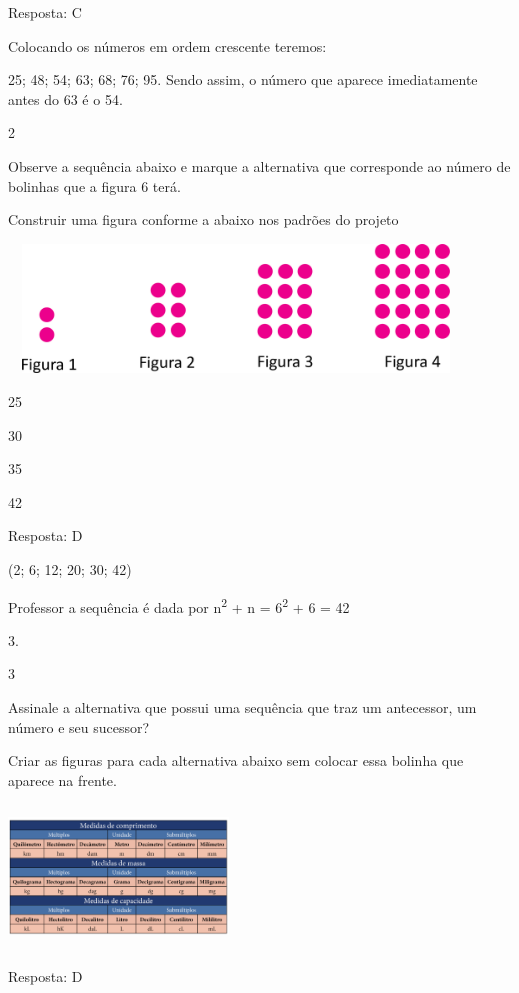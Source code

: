 \begin{escolha}
Resposta: C

Colocando os números em ordem crescente teremos:

25; 48; 54; 63; 68; 76; 95. Sendo assim, o número que aparece
imediatamente antes do 63 é o 54.

\num{2}

Observe a sequência abaixo e marque a alternativa que corresponde ao
número de bolinhas que a figura 6 terá.

Construir uma figura conforme a abaixo nos padrões do projeto

\includegraphics[width=4.75875in,height=1.35012in]{media/image37.png}

\begin{escolha}

\item
  25
\item
  30
\item
  35
\item
  42
\end{escolha}

Resposta: D

(2; 6; 12; 20; 30; 42)

Professor a sequência é dada por n\textsuperscript{2} + n =
6\textsuperscript{2} + 6 = 42

3.

\num{3}

Assinale a alternativa que possui uma sequência que traz um antecessor,
um número e seu sucessor?

Criar as figuras para cada alternativa abaixo sem colocar essa bolinha
que aparece na frente.

\includegraphics[width=2.30020in,height=1.50013in]{media/image38.png}

Resposta: D


\end{escolha}
